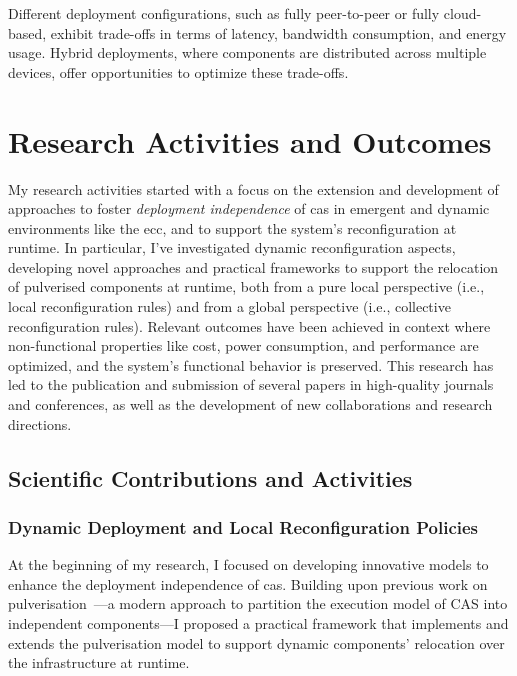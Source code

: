 \documentclass[runningheads]{llncs}
\begin{document}
Different deployment configurations,
such as fully peer-to-peer or fully cloud-based,
exhibit trade-offs in terms of latency, bandwidth consumption,
and energy usage.
%
Hybrid deployments,
where components are distributed across multiple devices,
offer opportunities to optimize these trade-offs.

\section{Research Activities and Outcomes}
\label{sec:research-activities}

My research activities started with a focus on the extension and development of approaches to foster \emph{deployment independence} of \ac{cas} in emergent and dynamic environments like the \ac{ecc},
and to support the system's reconfiguration at runtime.
%
In particular,
I've investigated dynamic reconfiguration aspects,
developing novel approaches and practical frameworks to support the relocation of pulverised components at runtime,
both from a pure local perspective (i.e., local reconfiguration rules) and from a global perspective (i.e., collective reconfiguration rules).
%
Relevant outcomes have been achieved in context where non-functional properties like cost,
power consumption,
and performance are optimized,
and the system's functional behavior is preserved.
%
This research has led to the publication and submission of several papers in high-quality journals and conferences,
as well as the development of new collaborations and research directions.

\subsection{Scientific Contributions and Activities}
\label{sec:scientific-contributions}

\subsubsection{Dynamic Deployment and Local Reconfiguration Policies}
At the beginning of my research,
I focused on developing innovative models to enhance the deployment independence of \ac{cas}.
%
Building upon previous work on pulverisation~\cite{DBLP:journals/fi/CasadeiPPVW20,DBLP:journals/iotj/CasadeiFPPSV22}---a modern approach to partition the execution model of CAS into independent components---I proposed a practical framework that implements and extends the pulverisation model to support dynamic components' relocation over the infrastructure at runtime.
\end{document}
